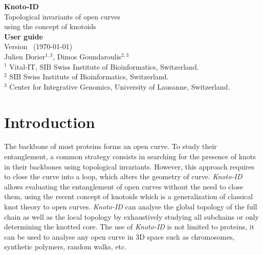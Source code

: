 \documentclass[a4paper,10pt]{article}
\begin{document}
\begin{titlepage}
  \begin{center}
\vspace*{30mm}
 {\Huge \bf Knoto-ID}\\
\vspace*{5mm}
\LARGE{Topological invariants of open curves\\
  using the concept of knotoids}\\
\vspace*{20mm}
\LARGE{\bf User guide}\\
\vspace*{5mm}
\normalsize Version \cmakeversion \ (\today)\\
\vspace*{10mm}
Julien Dorier$^{1,3}$, Dimos Goundaroulis$^{2,3}$\\
\vspace*{5mm}
\small
$^1$ Vital-IT, SIB Swiss Institute of Bioinformatics, Switzerland.\\
$^2$ SIB Swiss Institute of Bioinformatics, Switzerland.\\
$^3$ Center for Integrative Genomics, University of Lausanne, Switzerland.\\
\end{center}
\end{titlepage}
\newpage

\tableofcontents
\newpage


\section{Introduction}
The backbone of most proteins forms an open curve.  To study their
entanglement, a common strategy consists in searching for the presence
of knots in their backbones using topological invariants.  However,
this approach requires to close the curve into a loop, which alters
the geometry of curve.  {\it Knoto-ID} allows evaluating the
entanglement of open curves without the need to close them, using the
recent concept of knotoids\cite{turaev,guka} which is a generalization
of classical knot theory to open curves.  {\it Knoto-ID} can analyse
the global topology of the full chain as well as the local topology by
exhaustively studying all subchains or only determining the knotted
core.  The use of {\it Knoto-ID} is not limited to proteins, it can be
used to analyse any open curve in 3D space such as chromosomes,
synthetic polymers, random walks, etc.
\end{document}
